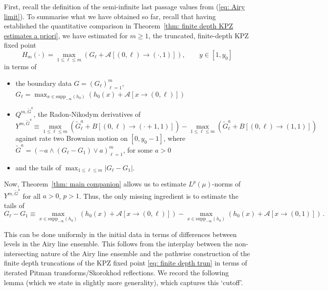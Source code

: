\documentclass[11pt, reqno]{amsart}
\numberwithin{equation}{section}
\begin{document}
First, recall the definition of the semi-infinite last passage values from (\ref{eq: Airy limit}). To summarise what we have obtained so far, recall that having established the quantitative comparison in Theorem~\ref{thm: finite depth KPZ estimates a priori}, we have estimated for $m\ge 1$, the truncated, finite-depth KPZ fixed point
\begin{equation}\label{eq: finite depth trun}
H_m(\cdot) = \displaystyle\max_{1 \le \ell \le m}(G_\ell + \mathcal{A}[(0,\ell)\to (\cdot ,1)]), \qquad y\in [1,y_0]
\end{equation}
in terms of 
\begin{itemize} 
\item[1.] the boundary data $G = (G_{\ell})_{\ell=1}^m$, $G_\ell = \displaystyle\max_{x\in \mathrm{supp}_{-\infty}(h_0)}(h_0(x)+\mathcal{A}[x\to (0,\ell)])$
\item[2.] $Q^{m, \tilde{G}^a}$, the Radon-Nikodym  derivatives of 
\begin{equation*}
Y^{m, \tilde{G}^a}\equiv \displaystyle\max_{1\le \ell \le m}(\tilde{G}^a_{\ell}  + B[(0,\ell)\to (\cdot+1,1)])-\displaystyle\max_{1\le \ell \le m}(\tilde{G}^a_{\ell} + B[(0,\ell)\to (1,1)])
\end{equation*}
against rate two Brownian motion on $[0, y_0-1]$, where $\tilde{G}^a = (-a\land (G_{\ell} -G_1) \lor a)_{\ell=1}^m$, for some $a > 0$
\item[3.] and the tails of $\max_{1\le \ell \le m} |G_\ell - G_1|$.
\end{itemize}

Now, Theorem~\ref{thm: main companion} allows us to estimate $L^p(\mu)$-norms of $Y^{m, \tilde{G}^a}$ for all $a>0$, $p>1$. Thus, the only missing ingredient is to estimate the tails of 
\begin{equation*}
G_\ell - G_1 \equiv \displaystyle\max_{x\in \mathrm{supp}_{-\infty}(h_0)}(h_0(x)+\mathcal{A}[x\to (0,\ell)]) - \displaystyle\max_{x\in \mathrm{supp}_{-\infty}(h_0)}(h_0(x)+\mathcal{A}[x\to (0,1)])\,.
\end{equation*}

This can be done uniformly in the initial data in terms of differences between levels in the Airy line ensemble. This follows from the interplay between the non-intersecting nature of the Airy line ensemble and the pathwise construction of the finite depth truncations of the KPZ fixed point \eqref{eq: finite depth trun} in terms of iterated Pitman transforms/Skorokhod reflections. We record the following lemma (which we state in slightly more generality), which captures this `cutoff'.
\end{document}
